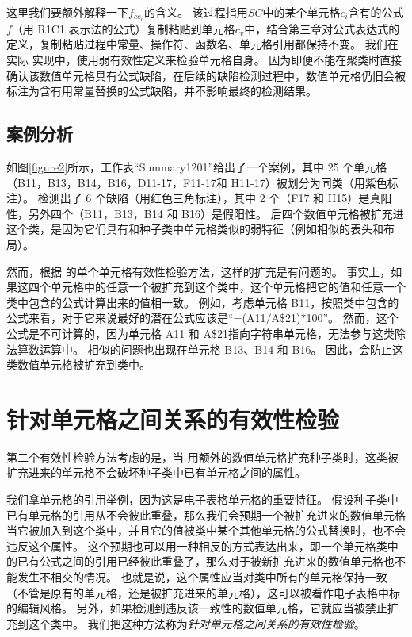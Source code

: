 这里我们要额外解释一下$f_{cc_v}$的含义。
该过程指用$SC$中的某个单元格$c_i$含有的公式$f$（用 R1C1 表示法的公式）复制粘贴到单元格$c_v$中，结合第三章对公式表达式的定义，复制粘贴过程中常量、操作符、函数名、单元格引用都保持不变。
我们在实际 \wa 实现中，使用弱有效性定义来检验单元格自身。
因为即便不能在聚类时直接确认该数值单元格具有公式缺陷，在后续的缺陷检测过程中，数值单元格仍旧会被标注为含有用常量替换的公式缺陷，并不影响最终的检测结果。

\subsection{案例分析}
如图\ref{figure2}所示，工作表“Summary1201”给出了一个案例，其中 25 个单元格（B11，B13，B14，B16，D11-17，F11-17和 H11-17）被\cu 划分为同类（用紫色标注）。
\cu 检测出了 6 个缺陷（用红色三角标注），其中 2 个（F17 和 H15）是真阳性，另外四个（B11，B13，B14 和 B16）是假阳性。
后四个数值单元格被扩充进这个类，是因为它们具有和种子类中单元格类似的弱特征（例如相似的表头和布局）。

然而，根据 \wa 的单个单元格有效性检验方法，这样的扩充是有问题的。
事实上，如果这四个单元格中的任意一个被扩充到这个类中，这个单元格把它的值和任意一个类中包含的公式计算出来的值相一致。
例如，考虑单元格 B11，按照类中包含的公式来看，对于它来说最好的潜在公式应该是“=(A11$/$A\$21)$*$100”。
然而，这个公式是不可计算的，因为单元格 A11 和 A\$21指向字符串单元格，无法参与这类除法算数运算中。
相似的问题也出现在单元格 B13、B14 和 B16。 
因此，\wa 会防止这类数值单元格被扩充到类中。


\section{针对单元格之间关系的有效性检验}
第二个有效性检验方法考虑的是，当 \wa 用额外的数值单元格扩充种子类时，这类被扩充进来的单元格不会破坏种子类中已有单元格之间的属性。

我们拿单元格的引用举例，因为这是电子表格单元格的重要特征。
假设种子类中已有单元格的引用从不会彼此重叠，那么我们会预期一个被扩充进来的数值单元格当它被加入到这个类中，并且它的值被类中某个其他单元格的公式替换时，也不会违反这个属性。
这个预期也可以用一种相反的方式表达出来，即一个单元格类中的已有公式之间的引用已经彼此重叠了，那么对于被新扩充进来的数值单元格也不能发生不相交的情况。
也就是说，这个属性应当对类中所有的单元格保持一致（不管是原有的单元格，还是被扩充进来的单元格），这可以被看作电子表格中标的编辑风格。
另外，如果检测到违反该一致性的数值单元格，它就应当被禁止扩充到这个类中。
我们把这种方法称为\textit{针对单元格之间关系的有效性检验}。

